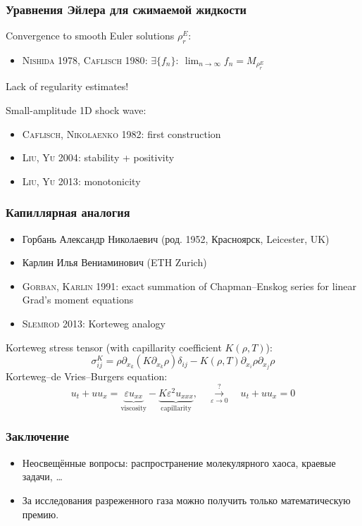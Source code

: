 \documentclass[mathserif]{beamer} %
\newcommand{\pder}[2][]{\partial_{#2}{#1}}
\newcommand{\Cite}[2][]{\alert{\textsc{#2 #1}}}
\renewcommand{\epsilon}{\varepsilon}
\begin{document}
\begin{frame}
    \frametitle{Уравнения Эйлера для сжимаемой жидкости}
    Convergence to smooth Euler solutions \(\rho_r^E\):
    \begin{itemize}
        \item \Cite[1978]{Nishida}, \Cite[1980]{Caflisch}:
        \(\exists \{f_n\}: \: \displaystyle\lim_{n\to\infty} f_n = M_{\rho_r^E}\)
    \end{itemize}
    Lack of regularity estimates!

    Small-amplitude 1D shock wave:
    \begin{itemize}
        \item \Cite[1982]{Caflisch, Nikolaenko}: first construction
        \item \Cite[2004]{Liu, Yu}: stability + positivity
        \item \Cite[2013]{Liu, Yu}: monotonicity
    \end{itemize}
\end{frame}

\begin{frame}
    \frametitle{Капиллярная аналогия}
    {\footnotesize
    \begin{itemize}
        \item Горбань Александр Николаевич (род. 1952, Красноярск, Leicester, UK) %
        \item Карлин Илья Вениаминович (ETH Zurich)
    \end{itemize}}
    \begin{itemize}
        \item \Cite[1991]{Gorban, Karlin}: exact summation of Chapman--Enskog series for linear Grad's moment equations
        \item \Cite[2013]{Slemrod}: Korteweg analogy
    \end{itemize}
    Korteweg stress tensor (with capillarity coefficient \(K(\rho,T)\)):
    \[ \sigma_{ij}^K = \rho\pder{x_k}\left( K\pder[\rho]{x_k} \right)\delta_{ij}
        - K(\rho,T)\pder[\rho]{x_i}\pder[\rho]{x_j} \]
    Korteweg–de Vries–Burgers equation:
    \[ u_t + uu_x = \underbrace{\epsilon u_{xx}}_\text{viscosity}
        - \underbrace{K\epsilon^2u_{xxx}}_\text{capillarity},
        \quad \overset{?}{\underset{\epsilon\to0}{\longrightarrow}}\quad u_t + uu_x = 0  \]
\end{frame}

\begin{frame}
    \frametitle{Заключение}
    \begin{itemize}
        \item Неосвещённые вопросы: распространение молекулярного хаоса, краевые задачи, \dots
        \item За исследования разреженного газа можно получить только математическую премию.
    \end{itemize}
\end{frame}
\end{document}
